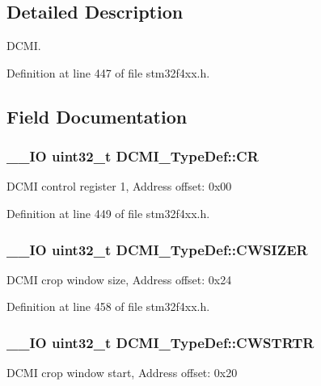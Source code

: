 \subsection{Detailed Description}
D\-C\-M\-I. 

Definition at line 447 of file stm32f4xx.\-h.



\subsection{Field Documentation}
\hypertarget{struct_d_c_m_i___type_def_a3cfcc9860ca551cbcb10c1c3dd4304f0}{
\subsubsection[{C\-R}]{\setlength{\rightskip}{0pt plus 5cm}\-\_\-\-\_\-\-I\-O {\bf uint32\-\_\-t} D\-C\-M\-I\-\_\-\-Type\-Def\-::\-C\-R}}\label{struct_d_c_m_i___type_def_a3cfcc9860ca551cbcb10c1c3dd4304f0}
D\-C\-M\-I control register 1, Address offset\-: 0x00 

Definition at line 449 of file stm32f4xx.\-h.

\hypertarget{struct_d_c_m_i___type_def_a1b9c8048339e19b110ecfbea486f55df}{
\subsubsection[{C\-W\-S\-I\-Z\-E\-R}]{\setlength{\rightskip}{0pt plus 5cm}\-\_\-\-\_\-\-I\-O {\bf uint32\-\_\-t} D\-C\-M\-I\-\_\-\-Type\-Def\-::\-C\-W\-S\-I\-Z\-E\-R}}\label{struct_d_c_m_i___type_def_a1b9c8048339e19b110ecfbea486f55df}
D\-C\-M\-I crop window size, Address offset\-: 0x24 

Definition at line 458 of file stm32f4xx.\-h.

\hypertarget{struct_d_c_m_i___type_def_a4d58830323e567117c12ae3feac613b9}{
\subsubsection[{C\-W\-S\-T\-R\-T\-R}]{\setlength{\rightskip}{0pt plus 5cm}\-\_\-\-\_\-\-I\-O {\bf uint32\-\_\-t} D\-C\-M\-I\-\_\-\-Type\-Def\-::\-C\-W\-S\-T\-R\-T\-R}}\label{struct_d_c_m_i___type_def_a4d58830323e567117c12ae3feac613b9}
D\-C\-M\-I crop window start, Address offset\-: 0x20 


